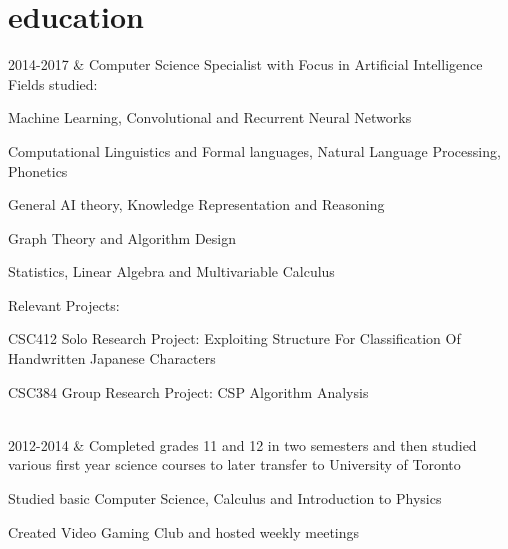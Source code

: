 \documentclass[]{cv-roald}
\begin{document}
\section*{education}
\begin{tabularcv}
    2014-2017   &   
                    \newline Computer Science Specialist with Focus in Artificial Intelligence
                    \newline Fields studied:
                    \begin{tabitemize}
                        \item Machine Learning, Convolutional and Recurrent Neural Networks
                        \item Computational Linguistics and Formal languages, Natural Language Processing, Phonetics
                        \item General AI theory, Knowledge Representation and Reasoning
                        \item Graph Theory and Algorithm Design
                        \item Statistics, Linear Algebra and Multivariable Calculus\newline
                    \end{tabitemize}
                    Relevant Projects:
                    \begin{tabitemize}
                        \item CSC412 Solo Research Project: Exploiting Structure For Classification Of Handwritten Japanese Characters
                        \item CSC384 Group Research Project: CSP Algorithm Analysis
                    \end{tabitemize}
                    \\[\vspacepar] %

    2012-2014   &   
                    \newline Completed grades 11 and 12 in two semesters and then studied various first year science courses to later transfer to University of Toronto
                    \begin{tabitemize}
                        \item Studied basic Computer Science, Calculus and Introduction to Physics
                        \item Created Video Gaming Club and hosted weekly meetings
                    \end{tabitemize}
                    \\[\vspacepar]
\end{tabularcv}
\end{document}
